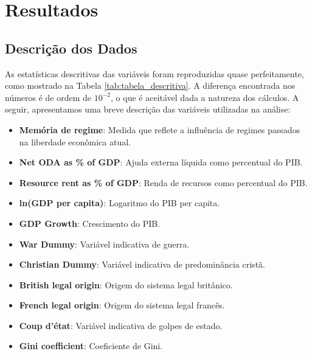 \chapter{Resultados}

\section{Descrição dos Dados}
As estatísticas descritivas das variáveis foram reproduzidas quase perfeitamente, como mostrado na Tabela \ref{tab:tabela_descritiva}. A diferença encontrada nos números é de ordem de $10^{-2}$, o que é aceitável dada a natureza dos cálculos. A seguir, apresentamos uma breve descrição das variáveis utilizadas na análise:

\begin{itemize}
    \item \textbf{Memória de regime}: Medida que reflete a influência de regimes passados na liberdade econômica atual.
    \item \textbf{Net ODA as \% of GDP}: Ajuda externa líquida como percentual do PIB.
    \item \textbf{Resource rent as \% of GDP}: Renda de recursos como percentual do PIB.
    \item \textbf{ln(GDP per capita)}: Logaritmo do PIB per capita.
    \item \textbf{GDP Growth}: Crescimento do PIB.
    \item \textbf{War Dummy}: Variável indicativa de guerra.
    \item \textbf{Christian Dummy}: Variável indicativa de predominância cristã.
    \item \textbf{British legal origin}: Origem do sistema legal britânico.
    \item \textbf{French legal origin}: Origem do sistema legal francês.
    \item \textbf{Coup d'état}: Variável indicativa de golpes de estado.
    \item \textbf{Gini coefficient}: Coeficiente de Gini.
\end{itemize}

